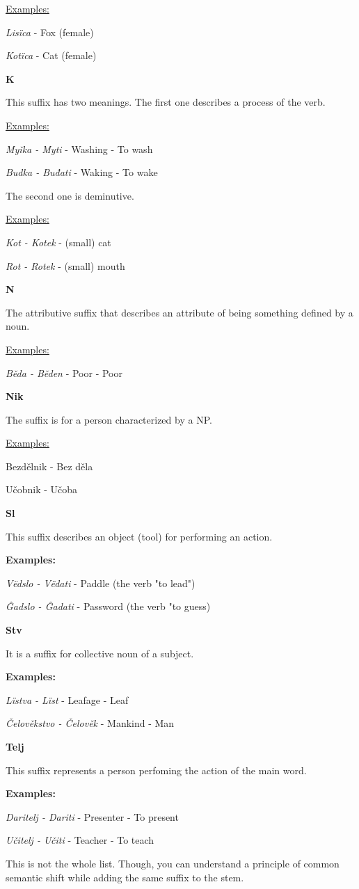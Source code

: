 \underline{Examples:}

\textit{Lisïca} - Fox (female)

\textit{Kotïca} - Cat (female)

\textbf{K}

This suffix has two meanings. The first one describes a process of the verb. 

\underline{Examples:}

\textit{Myǐka - Myti} - Washing - To wash

\textit{Budka - Buđati} - Waking - To wake

The second one is deminutive.

\underline{Examples:}

\textit{Kot - Kotek} - (small) cat

\textit{Rot - Rotek} - (small) mouth

\textbf{N}

The attributive suffix that describes an attribute of being something defined by a noun.

\underline{Examples:}

\textit{Běda - Běden} - Poor - Poor

\textbf{Nik}

The suffix is for a person characterized by a NP.

\underline{Examples:}

Bezdělnik - Bez děla

Učobnik - Učoba

\textbf{Sl}

This suffix describes an object (tool) for performing an action.

\textbf{Examples:}

\textit{Vëdslo - Vëdati} - Paddle (the verb "to lead")

\textit{Ĝadslo - Ĝadati} - Password (the verb "to guess)

\textbf{Stv}

It is a suffix for collective noun of a subject.

\textbf{Examples:}

\textit{Lïstva - Lïst} - Leafage - Leaf

\textit{Čelověkstvo - Čelověk} - Mankind - Man

\textbf{Telj}

This suffix represents a person perfoming the action of the main word.

\textbf{Examples:}

\textit{Daritelj - Dariti} - Presenter - To present

\textit{Učitelj - Učiti} - Teacher - To teach

This is not the whole list. Though, you can understand a principle of common semantic shift while adding the same suffix to the stem.

